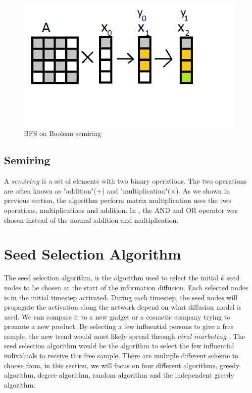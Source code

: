 \begin{figure}
	\includegraphics[width=\textwidth]{Figures/BFS_algo}
	\caption{BFS on Boolean semiring}
	\label{fig:bfsMatrix}
\end{figure}
\subsection{Semiring}
A $semiring$ is a set of elements with two binary operations. The two operations are often known as "addition"(+) and "multiplication"($\times$).  As we shown in previous section, the algorithm perform matrix multiplication uses the two operations, multiplications and addition. In  \cite{HybridBFS2015}, the AND and OR operator was chosen instead of the normal addition and multiplication. 

 
 
\section{Seed Selection Algorithm}
The seed selection algorithm, is the algorithm used to select the initial $k$ seed nodes to be chosen at the start of the information diffusion. Each selected nodes is in the initial timestep activated. During each timestep, the seed nodes will propagate the activation along the network depend on what diffusion model is used. We can compare it to a new gadget or a cosmetic company trying to promote a new product. By selecting a few influential persons to give a free sample, the new trend would most likely  spread through $viral$ $marketing$ \cite{ViralMarketing}. The seed selection algorithm would be the algorithm to select the few influential individuals to receive this free sample. There are multiple different scheme to choose from, in this section, we will focus on four different algorithms, greedy algorithm, degree algorithm, random algorithm and the independent greedy algorithm.

